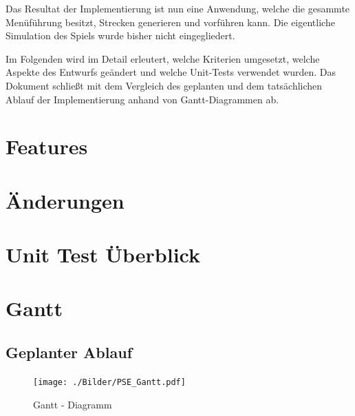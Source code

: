 \documentclass[parskip=full]{scrartcl}
\begin{document}
	Das Resultat der Implementierung ist nun eine Anwendung, welche die gesammte Menüführung besitzt, Strecken generieren und vorführen kann.
	Die eigentliche Simulation des Spiels wurde bisher nicht eingegliedert.

	Im Folgenden wird im Detail erleutert, welche Kriterien umgesetzt, welche Aspekte des Entwurfs geändert und welche Unit-Tests verwendet wurden.
	Das Dokument schließt mit dem Vergleich des geplanten und dem tatsächlichen Ablauf der Implementierung anhand von Gantt-Diagrammen ab.

	\pagebreak

	\section{Features}
	
	\pagebreak
	
	\pagebreak
	
	\pagebreak
	
	\pagebreak
	
	\pagebreak

	\section{Änderungen}
	
	\pagebreak
	
	\pagebreak
	
	\pagebreak
	
	\pagebreak
	
	\pagebreak

	\section{Unit Test Überblick}
	
	\pagebreak
	
	\pagebreak
	
	\pagebreak
	
	\pagebreak
	
	\pagebreak
	
	\section{Gantt}
	\subsection{Geplanter Ablauf}
	\begin{figure}[htbp]
		\centering
		\texttt{[image: ./Bilder/PSE\_Gantt.pdf]}
		\caption{Gantt - Diagramm}
	\end{figure}
\end{document}
